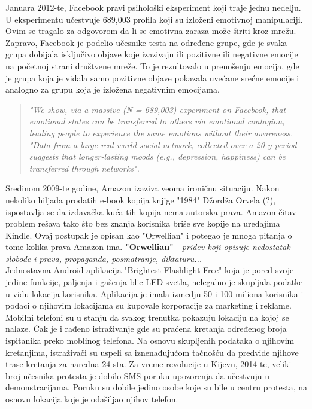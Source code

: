 \documentclass[a4paper]{article}
\begin{document}
	Januara 2012-te, Facebook pravi psihološki eksperiment koji 
traje jednu nedelju. U eksperimentu učestvuje 689,003 profila koji su izloženi emotivnoj manipulaciji. Ovim se tragalo za odgovorom da li se emotivna zaraza može širiti kroz mrežu. Zapravo, Facebook je podelio učesnike testa na određene grupe, gde je svaka grupa dobijala isključivo objave koje izazivaju ili pozitivne ili negativne emocije na početnoj strani društvene mreže. To je rezultovalo u prenošenju emocija, gde je grupa koja je viđala samo pozitivne objave pokazala uvećane srećne emocije i analogno 	za grupu koja je izložena negativnim emocijama. \cite{?}
\begin{quotation}
	\textit{"We show, via a massive (N = 689,003) experiment on Facebook, that emotional states can be transferred to others via emotional contagion, leading people to experience the same emotions without their awareness.
"Data from a large real-world social network, collected over a 20-y period suggests that longer-lasting moods (e.g., depression, happiness) can be transferred through networks". \cite{?}}\\
\end{quotation}
	
	Sredinom 2009-te godine, Amazon izaziva veoma ironičnu 
situaciju. Nakon nekoliko hiljada prodatih e-book kopija knjige "1984" Džordža Orvela (?), ispostavlja se da izdavačka kuća tih kopija nema autorska prava. Amazon čitav problem rešava tako što bez znanja korisnika briše sve kopije na uređajima Kindle. Ovaj postupak je opisan kao "Orwellian" i potegao je mnoga pitanja o tome kolika prava Amazon ima. \cite{?}
\textbf{"Orwellian"} - \textit{pridev koji opisuje nedostatak slobode i prava, propaganda, posmatranje, diktaturu...}\\

	Jednostavna Android aplikacija "Brightest Flashlight 
Free" koja je pored svoje jedine funkcije, paljenja i gašenja blic LED svetla, nelegalno je skupljala podatke u vidu lokacija korisnika. Aplikacija je imala izmedju 50 i 100 miliona korisnika i podaci o njihovim lokacijama su kupovale korporacije za marketing i reklame.\cite{?}\\

	Mobilni telefoni su u stanju da svakog trenutka pokazuju lokaciju na kojoj se nalaze. Čak je i rađeno istraživanje gde su praćena kretanja određenog broja ispitanika preko moblinog telefona. Na osnovu skupljenih podataka o njihovim kretanjima, istraživači su uspeli sa iznenađujućom tačnošću da predvide njihove trase kretanja za naredna 24 sta. Za vreme revolucije u Kijevu, 2014-te, veliki broj učesnika protesta je dobilo SMS poruku upozorenja da učestvuju u demonstracijama. Poruku su dobile jedino osobe koje su bile u centru protesta, na osnovu lokacija koje je odašiljao njihov telefon. \cite{?}\\
\end{document}
